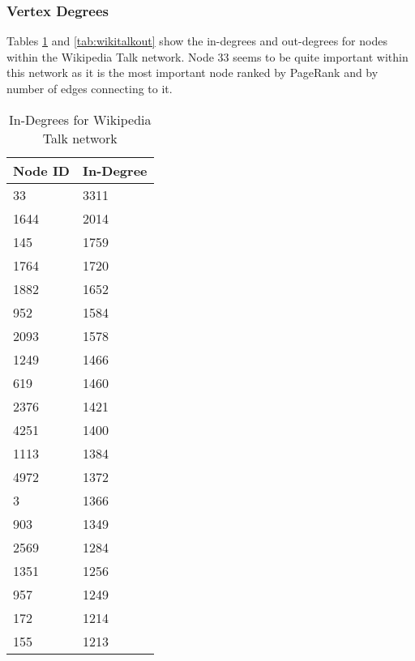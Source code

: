 \subsubsection{Vertex Degrees}
Tables \ref{tab:wikitalkin} and \ref{tab:wikitalkout} show the in-degrees and out-degrees for nodes within the Wikipedia Talk network. Node 33 seems to be quite important within this network as it is the most important node ranked by PageRank and by number of edges connecting to it.

\begin{table}%
\centering
\begin{tabular}{|l|l|}
\hline
Node ID & In-Degree \\
\hline
33 & 3311 \\
1644 & 2014 \\
145 & 1759 \\
1764 & 1720 \\
1882 & 1652 \\
952 & 1584 \\
2093 & 1578 \\
1249 & 1466 \\
619 & 1460 \\
2376 & 1421 \\
4251 & 1400 \\
1113 & 1384 \\
4972 & 1372 \\
3 & 1366 \\
903 & 1349 \\
2569 & 1284 \\
1351 & 1256 \\
957 & 1249 \\
172 & 1214 \\
155 & 1213 \\
\hline
\end{tabular}
\caption{In-Degrees for Wikipedia Talk network}
\label{tab:wikitalkin}
\end{table}

